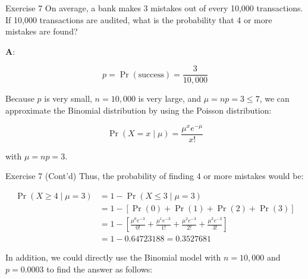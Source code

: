 \documentclass[
  ignorenonframetext,
  aspectratio=43,
]{beamer}
\begin{document}
\begin{frame}{Exercise 7}
\protect\hypertarget{exercise-7}{}
On average, a bank makes 3 mistakes out of every 10,000 transactions. If
10,000 transactions are audited, what is the probability that 4 or more
mistakes are found?

\pause

\textbf{A}: \vspace{-20pt}

\[
p = \Pr(\text{success}) = \frac{3}{10,000}
\]

Because \(p\) is very small, \(n = 10,000\) is very large, and
\(\mu = np = 3 \le 7\), we can approximate the Binomial distribution by
using the Poisson distribution:

\[
\Pr(X = x \mid \mu) = \frac{\mu^x e^{-\mu}}{x!}
\]

with \(\mu = np = 3\).
\end{frame}

\begin{frame}{Exercise 7 (Cont'd)}
\protect\hypertarget{exercise-7-contd}{}
Thus, the probability of finding 4 or more mistakes would be:
\vspace{-10pt}

\[
\begin{aligned}
\Pr(X \ge 4 \mid \mu = 3) &= 1 - \Pr(X \le 3 \mid \mu = 3) \\
                          &= 1 - [\Pr(0) + \Pr(1) + \Pr(2) + \Pr(3)] \\
                          &= 1 - \left[
                                        \frac{\mu^0 e^{-3}}{0!} +
                                        \frac{\mu^1 e^{-3}}{1!} +
                                        \frac{\mu^2 e^{-3}}{2!} +
                                        \frac{\mu^3 e^{-3}}{3!}
                                        \right] \\
                          &= 1 - 0.64723188 = 0.3527681
\end{aligned}
\]

In addition, we could directly use the Binomial model with
\(n = 10,000\) and \(p = 0.0003\) to find the answer as follows:
\end{frame}
\end{document}
